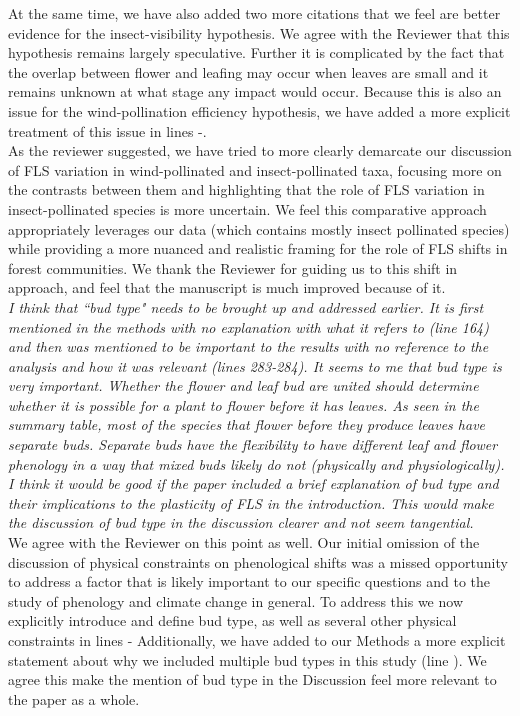 \documentclass[11pt]{article}
\begin{document}
\noindent At the same time, we have also added two more citations that we feel are better evidence for the insect-visibility hypothesis. We agree with the Reviewer that this hypothesis remains largely speculative. Further it is complicated by the fact that the overlap between flower and leafing may occur when leaves are small and it remains unknown at what stage any impact would occur. Because this is also an issue for the wind-pollination efficiency hypothesis, we have added a more explicit treatment of this issue in lines -.\\ 

\noindent As the reviewer suggested, we have tried to more clearly demarcate our discussion of FLS variation in wind-pollinated and insect-pollinated taxa, focusing more on the contrasts between them and highlighting that the role of FLS variation in insect-pollinated species is more uncertain. We feel this comparative approach appropriately leverages our data (which contains mostly insect pollinated species) while providing a more nuanced and realistic framing for the role of FLS shifts in forest communities. We thank the Reviewer for guiding us to this shift in approach, and feel that the manuscript is much improved because of it.\\

\emph{I think that ``bud type" needs to be brought up and addressed earlier. It is first mentioned in the methods with no explanation with what it refers to (line 164) and then was mentioned to be important to the results with no reference to the analysis and how it was relevant (lines 283-284). It seems to me that bud type is very important. Whether the flower and leaf bud are united should determine whether it is possible for a plant to flower before it has leaves.  As seen in the summary table, most of the species that flower before they produce leaves have separate buds. Separate buds have the flexibility to have different leaf and flower phenology in a way that mixed buds likely do not (physically and physiologically). I think it would be good if the paper included a brief explanation of bud type and their implications to the plasticity of FLS in the introduction. This would make the discussion of bud type in the discussion clearer and not seem tangential.}\\

\noindent We agree with the Reviewer on this point as well. Our initial omission of the discussion of physical constraints on phenological shifts was a missed opportunity to address a factor that is likely important to our specific questions and to the study of phenology and climate change in general. To address this we now explicitly introduce and define bud type, as well as several other physical constraints in lines - Additionally, we have added to our Methods a more explicit statement about why we included multiple bud types in this study (line ). We agree this make the mention of bud type in the Discussion feel more relevant to the paper as a whole. \\
\end{document}
